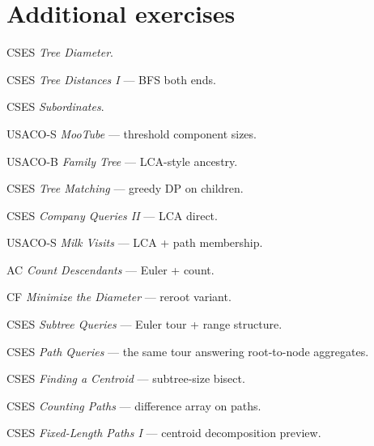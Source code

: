 \section{Additional exercises}
\begin{exercise}[easy] CSES \emph{Tree Diameter}. \end{exercise}
\begin{exercise}[easy] CSES \emph{Tree Distances I} --- BFS both ends. \end{exercise}
\begin{exercise}[easy] CSES \emph{Subordinates}. \end{exercise}
\begin{exercise}[easy] USACO-S \emph{MooTube} --- threshold component sizes. \end{exercise}
\begin{exercise}[easy] USACO-B \emph{Family Tree} --- LCA-style ancestry. \end{exercise}
\begin{exercise}[medium] CSES \emph{Tree Matching} --- greedy DP on children. \end{exercise}
\begin{exercise}[medium] CSES \emph{Company Queries II} --- LCA direct. \end{exercise}
\begin{exercise}[medium] USACO-S \emph{Milk Visits} --- LCA + path membership. \end{exercise}
\begin{exercise}[medium] AC \emph{Count Descendants} --- Euler + count. \end{exercise}
\begin{exercise}[medium] CF \emph{Minimize the Diameter} --- reroot variant. \end{exercise}
\begin{exercise}[medium] CSES \emph{Subtree Queries} --- Euler tour + range structure. \end{exercise}
\begin{exercise}[medium] CSES \emph{Path Queries} --- the same tour answering root-to-node aggregates. \end{exercise}
\begin{exercise}[hard] CSES \emph{Finding a Centroid} --- subtree-size bisect. \end{exercise}
\begin{exercise}[hard] CSES \emph{Counting Paths} --- difference array on paths. \end{exercise}
\begin{exercise}[hard] CSES \emph{Fixed-Length Paths I} --- centroid decomposition preview. \end{exercise}

